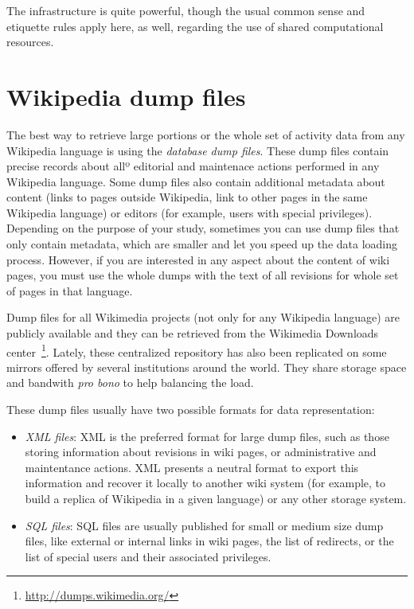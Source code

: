 The infrastructure is quite powerful, though the usual common sense and etiquette rules
apply here, as well, regarding the use of shared computational resources.

\section{Wikipedia dump files}
\label{sec:dump-files}
The best way to retrieve large portions or the whole set of activity data 
from any Wikipedia language is using the \textit{database dump files}. These
dump files contain precise records about allº editorial and maintenace actions 
performed in any Wikipedia language. Some dump files also contain additional
metadata about content (links to pages outside Wikipedia, link to other pages
in the same Wikipedia language) or editors (for example, users with special
privileges). Depending on the purpose of your study, sometimes you can use
dump files that only contain metadata, which are smaller and let you speed up
the data loading process. However, if you are interested in any aspect about
the content of wiki pages, you must use the whole dumps with the text of all
revisions for whole set of pages in that language.

Dump files for all Wikimedia projects (not only for any Wikipedia language)
are publicly available and they can be retrieved from the Wikimedia 
Downloads center~\footnote{\url{http://dumps.wikimedia.org/}}.
Lately, these centralized repository has also been replicated on some mirrors 
offered by several institutions around the world. They share storage space and 
bandwith \textit{pro bono} to help balancing the load.

These dump files usually have two possible formats for data representation:

\begin{itemize}
 \item \textit{XML files}: XML is the preferred format for large dump files, such
as those storing information about revisions in wiki pages, or administrative and
maintentance actions. XML presents a neutral format to
export this information and recover it locally to another wiki system (for example,
to build a replica of Wikipedia in a given language) or any other storage system.

 \item \textit{SQL files}: SQL files are usually published for small or medium
size dump files, like external or internal links in wiki pages, the list of
redirects, or the list of special users and their associated privileges. 
\end{itemize}

